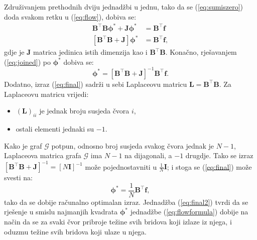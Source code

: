 \documentclass[lmodern, utf8, diplomski, numeric]{fer}
\newcommand{\matr}[1]{\mathbold{#1}}
\newcommand{\graph}[1]{\mathcal{#1}}
\newcommand{\T}{\top}
\newcommand{\q}{\left}
\newcommand{\w}{\right}
\begin{document}
  Združivanjem prethodnih dviju jednadžbi u jednu, tako da se (\ref{eq:sumiszero}) doda svakom retku u (\ref{eq:flow}), dobiva se:
  \begin{align}
  \matr{B}^\T \matr{B} \matr{\phi^*} + \matr{J} \matr{\phi^*} &= \matr{B}^\T \matr{f} \nonumber \\
  \label{eq:joined}
  \q[\matr{B}^\T \matr{B} + \matr{J} \w] \matr{\phi^*} &= \matr{B}^\T \matr{f},
  \end{align}
  gdje je $\matr{J}$ matrica jedinica istih dimenzija kao i $\matr{B}^\T \matr{B}$.
  Konačno, rješavanjem (\ref{eq:joined}) po $\matr{\phi^*}$ dobiva se:
  \begin{equation}
  \label{eq:final}
  \matr{\phi^*} = \q[\matr{B}^\T \matr{B} + \matr{J} \w]^{-1} \matr{B}^\T \matr{f}.
  \end{equation}
  Dodatno, izraz (\ref{eq:final}) sadrži u sebi Laplaceovu matricu $\matr{L} = \matr{B}^\T\matr{B}$.
  Za Laplaceovu matricu vrijedi:
  \begin{itemize}
    \item $(\matr{L})_{ii}$ je jednak broju susjeda čvora $i$,
    \item ostali elementi jednaki su $-1$.
  \end{itemize}
  Kako je graf $\graph{G}$ potpun, odnosno broj susjeda svakog čvora jednak je $N - 1$, Laplaceova matrica grafa $\graph{G}$ ima $N - 1$ na dijagonali, a $-1$ drugdje. Tako se izraz $\q[ \matr{B}^\T \matr{B} + \matr{J} \w]^{-1} = \q[ N \matr{I} \w]^{-1}$ može pojednostavniti u $\frac{1}{N} \matr{I}$; i stoga se (\ref{eq:final}) može svesti na:
  \begin{equation}
  \label{eq:final2}
  \matr{\phi^*} = \frac{1}{N} \matr{B}^\T \matr{f},
  \end{equation}
  tako da se dobije računalno optimalan izraz.
  Jednadžba (\ref{eq:final2}) tvrdi da se rješenje u smislu najmanjih kvadrata $\matr{\phi^*}$ jednadžbe (\ref{eq:flowformula}) dobije na način da se za svaki čvor pribroje težine svih bridova koji izlaze iz njega, i oduzmu težine svih bridova koji ulaze u njega.
  
\end{document}
